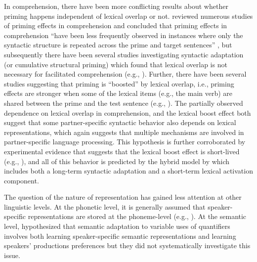 In comprehension, there have been more conflicting results about whether priming happens independent of lexical overlap or not.
\cite{TooleyTraxler2010} reviewed numerous studies of priming effects in comprehension and concluded that priming effects in comprehension
 ``have been less frequently observed in instances where only the syntactic structure is repeated across the prime and target sentences'' \cite{TooleyTraxler2010},
but subsequently there have been several studies investigating syntactic adaptation (or cumulative structural priming) which found that lexical overlap is not
necessary for facilitated comprehension (e.g., \cite{FineJaeger2016}). Further, there have been several studies suggesting that priming is 
``boosted'' by lexical overlap, i.e., priming effects are stronger when some of the lexical items
(e.g.,  the main verb) are shared between the prime and the test sentence 
(e.g., \cite{SegertEtAl2013,TraxlerTooleyPickering2014,ClelandPickering2006,CorleyScheepers2002,BraniganPickeringCleland2000}).
The partially observed dependence
on lexical overlap in comprehension, and the lexical boost effect both suggest that some partner-specific syntactic behavior also depends on 
lexical representations, which again suggests that multiple mechanisms are involved in partner-specific language processing. This hypothesis
is further corroborated by experimental evidence that suggests that the lexical boost effect is short-lived (e.g., \cite{HartsuikerEtAl2008}), and all
of this behavior is predicted by the hybrid model by \cite{ReitterEtAl2011} which includes both a long-term syntactic adaptation and a short-term
lexical activation component.

The question of the nature of representation has gained less attention at other linguistic levels. At the phonetic level, it is generally assumed
that speaker-specific representations are stored at the phoneme-level (e.g., \cite{EisnerMcQueen2005}). At the semantic level, \cite{Yildirim2016}
hypothesized that semantic adaptation to variable uses of quantifiers  involves both learning speaker-specific semantic representations
and learning speakers' productions preferences but they did not systematically investigate this issue. 

